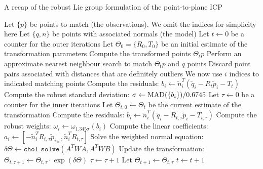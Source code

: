 \begin{algorithm}
\caption{A recap of the robust Lie group formulation of the point-to-plane ICP}\label{in:alg:liep2plan}
\begin{algorithmic}
\State Let $\{p\}$ be points to match (the observations). We omit the indices for simplicity here
\State Let $\{q,n\}$ be points with associated normals (the model)
\State Let $t \gets 0$ be a counter for the outer iterations
\State Let $\Theta_0 = \{R_0,T_0\}$ be an initial estimate of the transformation parameters
  \State Compute the transformed points $\Theta_t p$
  \State Perform an approximate nearest neighbour search to match $\Theta_t p$ and $q$ points
  \State Discard point pairs associated with distances that are definitely outliers
  \State We now use $i$ indices to indicated matching points
  \State Compute the residuals: $b_i \gets \tilde{n}_i^T (\tilde{q}_i - R_t \tilde{p}_i - T_t)$
  \State {}
  \State Compute the robust standard deviation: $\sigma \gets \operatorname{MAD}(\{b_i\})/0.6745$
  \State {}
  \State Let $\tau \gets 0$ be a counter for the inner iterations
  \State Let $\Theta_{t,0} \gets \Theta_{t}$ be the current estimate of the transformation
      \State Compute the residuals: $b_i \gets \tilde{n}_i^T (\tilde{q}_i - R_{t,\tau} \tilde{p}_i - T_{t,\tau})$
    \EndIf
    \State Compute the robust weights: $\omega_i \gets \omega_{1.345\sigma}(b_i)$
    \State Compute the linear coefficients: $a_i \gets [-\tilde{n}_i^T R_{t,\tau} {{\tilde{p}}_{i}}_{\times}, \tilde{n}_i^T R_{t,\tau}]$
    \State Solve the weighted normal equation:
    \State \quad $\delta\Theta \gets \texttt{chol\_solve}(A^T W A, A^T W B)$
    \State Update the transformation: $\Theta_{t,\tau+1} \gets \Theta_{t,\tau} \cdot \exp(\delta\Theta)$
    \State $\tau \gets \tau+1$
  \EndWhile
  \State Let $\Theta_{t+1} \gets \Theta_{t,\tau}$
  \State $t \gets t+1$
\EndWhile
\end{algorithmic}
\end{algorithm}

